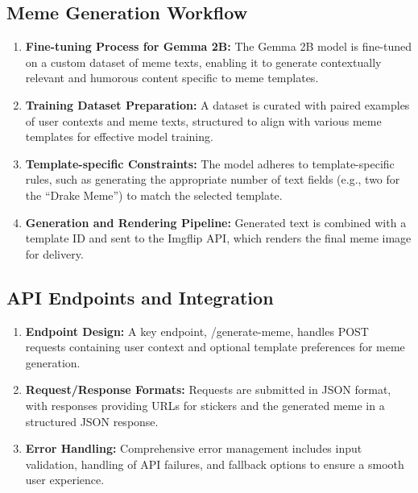 \documentclass[conference]{IEEEtran}
\begin{document}
\subsection{Meme Generation Workflow}
\begin{enumerate}
    \item \textbf{Fine-tuning Process for Gemma 2B:} The Gemma 2B model is fine-tuned on a custom dataset of meme texts, enabling it to generate contextually relevant and humorous content specific to meme templates.
    \item \textbf{Training Dataset Preparation:} A dataset is curated with paired examples of user contexts and meme texts, structured to align with various meme templates for effective model training.
    \item \textbf{Template-specific Constraints:} The model adheres to template-specific rules, such as generating the appropriate number of text fields (e.g., two for the “Drake Meme”) to match the selected template.
    \item \textbf{Generation and Rendering Pipeline:} Generated text is combined with a template ID and sent to the Imgflip API, which renders the final meme image for delivery.
\end{enumerate}

\subsection{API Endpoints and Integration}
\begin{enumerate}
    \item \textbf{Endpoint Design:} A key endpoint, /generate-meme, handles POST requests containing user context and optional template preferences for meme generation.
    \item \textbf{Request/Response Formats:} Requests are submitted in JSON format, with responses providing URLs for stickers and the generated meme in a structured JSON response.
    \item \textbf{Error Handling:} Comprehensive error management includes input validation, handling of API failures, and fallback options to ensure a smooth user experience.
\end{enumerate}

% 
\end{document}
